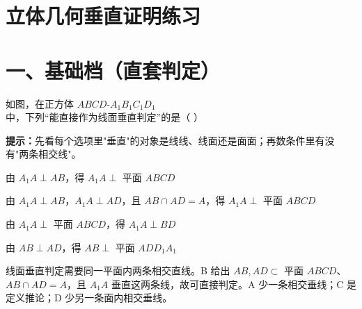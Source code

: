 \documentclass{exam-zh}
\begin{document}
\section*{立体几何垂直证明练习}

\section*{一、基础档（直套判定）}


\begin{question}[points=5]
  \noindent
  \begin{minipage}[t]{\dimexpr\linewidth-60mm-6mm\relax}
    \vspace{0pt}
    如图，在正方体 $ABCD\text{-}A_1B_1C_1D_1$ 中，下列“能直接作为线面垂直判定”的是（    ）
    \begin{hintbox}
\textbf{提示：}先看每个选项里"垂直"的对象是线线、线面还是面面；再数条件里有没有"两条相交线"。\end{hintbox}

    \par
    \begin{choices}[columns=1]
      \item 由 $A_1A\perp AB$，得 $A_1A\perp$ 平面 $ABCD$
      \item 由 $A_1A\perp AB$，$A_1A\perp AD$，且 $AB\cap AD=A$，得 $A_1A\perp$ 平面 $ABCD$
      \item 由 $A_1A\perp$ 平面 $ABCD$，得 $A_1A\perp BD$
      \item 由 $AB\perp AD$，得 $AB\perp$ 平面 $ADD_1A_1$
    \end{choices}
  \end{minipage}\hfill
  \begin{diagramcoltikz}{60mm}{正方体，观察侧棱与底面内两条相交棱的关系。}
  }
  \end{diagramcoltikz}
  \paren[B]
  \begin{solutionblock}
    线面垂直判定需要同一平面内两条相交直线。B 给出 $AB,AD\subset$ 平面 $ABCD$、$AB\cap AD=A$，且 $A_1A$ 垂直这两条线，故可直接判定。A 少一条相交垂线；C 是定义推论；D 少另一条面内相交垂线。
  \end{solutionblock}
\end{question}
\end{document}
